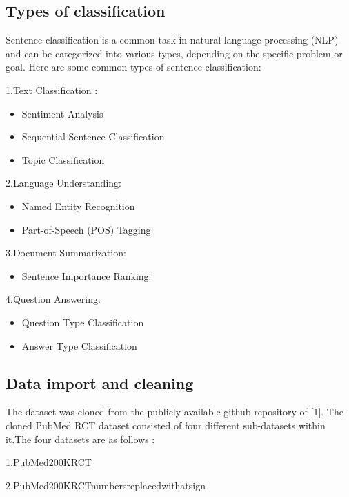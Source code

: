 \documentclass[conference]{IEEEtran}
\begin{document}
\subsection{Types of classification}

Sentence classification is a common task in natural language processing (NLP) and can be categorized into various types, depending on the specific problem or goal. Here are some common types of sentence classification:

1.Text Classification : 
    \begin{itemize}
        \addtolength{\leftmargin}{10pt}
        \item Sentiment Analysis
        \item Sequential Sentence Classification
        \item Topic Classification
    \end{itemize}

2.Language Understanding:
    \begin{itemize}
        \addtolength{\leftmargin}{10pt}
        \item Named Entity Recognition
        \item Part-of-Speech (POS) Tagging
    \end{itemize}
    
3.Document Summarization:
    \begin{itemize}
        \addtolength{\leftmargin}{10pt}
        \item Sentence Importance Ranking:
    \end{itemize}

4.Question Answering:
    \begin{itemize}
        \addtolength{\leftmargin}{10pt}
        \item Question Type Classification
        \item Answer Type Classification
    \end{itemize}


\subsection{Data import and cleaning}
The dataset was cloned from the publicly available github repository of [1]. The cloned PubMed RCT dataset consisted of four different sub-datasets within it.The four datasets are as follows :

1.PubMed\textunderscore200K\textunderscore RCT

2.PubMed\textunderscore200K\textunderscore RCT\textunderscore numbers\textunderscore replaced\textunderscore with\textunderscore at\textunderscore sign
\end{document}
